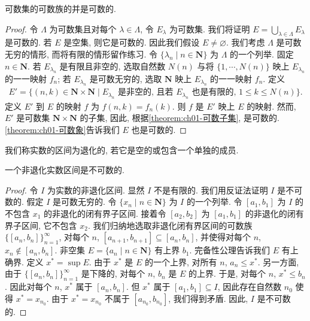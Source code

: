 \documentclass[../../main.tex]{subfiles}
\begin{document}
\begin{corollary}\label{corollary:ch01-可数族并}
可数集的可数族的并是可数的.
\end{corollary}

\begin{proof}
令 $\Lambda$ 为可数集且对每个 $\lambda\in\Lambda$, 令 $E_{\lambda}$ 为可数集. 我们将证明 $E=\bigcup_{\lambda\in\Lambda}E_{\lambda}$ 是可数的. 若 $E$ 是空集, 则它是可数的. 因此我们假设 $E\neq\varnothing$. 我们考虑 $\Lambda$ 是可数无穷的情形, 而将有限的情形留作练习. 令 $\{\lambda_{n}\mid n\in\mathbf{N}\}$ 为 $\Lambda$ 的一个列举. 固定 $n\in\mathbf{N}$. 若 $E_{\lambda_{n}}$ 是有限且非空的, 选取自然数 $N(n)$ 与将 $\{1,\cdots,N(n)\}$ 映上 $E_{\lambda_{n}}$ 的一一映射 $f_{n}$; 若 $E_{\lambda_{n}}$ 是可数无穷的, 选取 $\mathbf{N}$ 映上 $E_{\lambda_{n}}$ 的一一映射 $f_{n}$. 定义
\begin{align*}
E'=\{(n,k)\in\mathbf{N}\times\mathbf{N}\mid E_{\lambda_{n}}\text{ 是非空的, 且若 }E_{\lambda_{n}}\text{ 也是有限的, }1\leqslant k\leqslant N(n)\}.
\end{align*}
定义 $E'$ 到 $E$ 的映射 $f$ 为 $f(n,k)=f_{n}(k)$. 则 $f$ 是 $E'$ 映上 $E$ 的映射. 然而, $E'$ 是可数集 $\mathbf{N}\times\mathbf{N}$ 的子集, 因此, 根据\cref{theorem:ch01-可数子集}, 是可数的.\cref{theorem:ch01-可数象}告诉我们 $E$ 也是可数的.
\end{proof}

我们称实数的区间为退化的, 若它是空的或包含一个单独的成员.

\begin{theorem}\label{theorem:ch01-区间不可数}
一个非退化实数区间是不可数的.
\end{theorem}

\begin{proof}
令 $I$ 为实数的非退化区间. 显然 $I$ 不是有限的. 我们用反证法证明 $I$ 是不可数的. 假定 $I$ 是可数无穷的. 令 $\{x_{n}\mid n\in\mathbf{N}\}$ 为 $I$ 的一个列举. 令 $[a_{1},b_{1}]$ 为 $I$ 的不包含 $x_{1}$ 的非退化的闭有界子区间. 接着令 $[a_{2},b_{2}]$ 为 $[a_{1},b_{1}]$ 的非退化的闭有界子区间, 它不包含 $x_{2}$. 我们归纳地选取非退化闭有界区间的可数族 $\{[a_{n},b_{n}]\}_{n=1}^{\infty}$, 对每个 $n$, $[a_{n+1},b_{n+1}]\subseteq[a_{n},b_{n}]$, 并使得对每个 $n$, $x_{n}\notin[a_{n},b_{n}]$. 非空集 $E=\{a_{n}\mid n\in\mathbf{N}\}$ 有上界 $b_{1}$. 完备性公理告诉我们 $E$ 有上确界. 定义 $x^{*}=\sup E$. 由于 $x^{*}$ 是 $E$ 的一个上界, 对所有 $n$, $a_{n}\leqslant x^{*}$. 另一方面, 由于 $\{[a_{n},b_{n}]\}_{n=1}^{\infty}$ 是下降的, 对每个 $n$, $b_{n}$ 是 $E$ 的上界. 于是, 对每个 $n$, $x^{*}\leqslant b_{n}$. 因此对每个 $n$, $x^{*}$ 属于 $[a_{n},b_{n}]$. 但 $x^{*}$ 属于 $[a_{1},b_{1}]\subseteq I$, 因此存在自然数 $n_{0}$ 使得 $x^{*}=x_{n_{0}}$. 由于 $x^{*}=x_{n_{0}}$ 不属于 $[a_{n_{0}},b_{n_{0}}]$, 我们得到矛盾. 因此, $I$ 是不可数的.
\end{proof}
\end{document}
